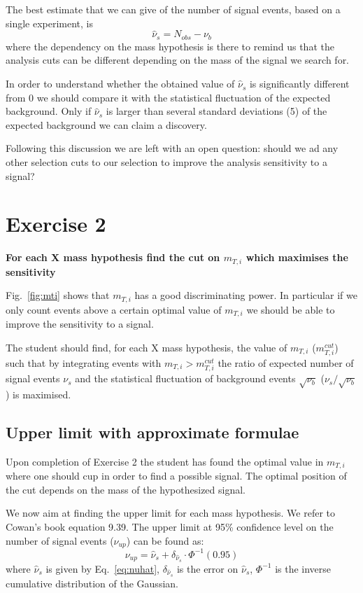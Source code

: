\documentclass[a4paper,12pt]{article}
\begin{document}
The best estimate that we can give of the number of signal events, based on a
single experiment, is
\begin{equation}
\hat{\nu}_s=N_{obs}-\nu_b
\label{eq:nuhat}
\end{equation}
where the dependency on the mass hypothesis is there to remind us that the
analysis cuts can be different depending on the mass of the signal we search
for.

In order to understand whether the obtained value of $\hat{\nu}_s$ is
significantly different from 0 we should compare it with the statistical
fluctuation of the expected background. Only if $\hat{\nu}_s$ is larger
than several standard deviations (5) of the expected background we can claim a
discovery.

Following this discussion we are left with an open question: should we ad any
other selection cuts to our selection to improve the analysis sensitivity to a
signal?

\section*{Exercise 2}
{\bf For each X mass hypothesis find the cut on $m_{T,i}$ which maximises the
sensitivity}

Fig.~\ref{fig:mti} shows that $m_{T,i}$ has a good discriminating power. In
particular if we only count events above a certain optimal value of  $m_{T,i}$ we
should be able to improve the sensitivity to a signal. 

The student should find, for each X mass hypothesis, the value of $m_{T,i}$
($m_{T,i}^{cut}$) such that by integrating events with
$m_{T,i}>m_{T,i}^{cut}$ the ratio of expected number of signal events
$\nu_s$ and the statistical fluctuation of background events
$\sqrt{\nu_b}$ ($\nu_s/\sqrt{\nu_b}$) is maximised.

\subsection{Upper limit with approximate formulae}
Upon completion of Exercise 2 the student has found the optimal value in
$m_{T,i}$ where one should cup in order to find a possible signal. The optimal
position of the cut depends on the mass of the hypothesized signal.

We now aim at finding the upper limit for each mass hypothesis.
We refer to Cowan's book equation 9.39. The upper limit at 95\% confidence
level on the number of signal events ($\nu_{up}$) can be found as:
\begin{equation}
\nu_{up} = \hat{\nu}_s + \delta_{\hat{\nu}_s}\cdot\Phi^{-1}(0.95)
\label{eq:limitcowan}
\end{equation}
where $\hat{\nu}_s$ is given by Eq.~\ref{eq:nuhat}, $\delta_{\hat{\nu}_s}$ 
is the error on $\hat{\nu}_s$, $\Phi^{-1}$ is the inverse cumulative distribution 
of the Gaussian.
\end{document}
